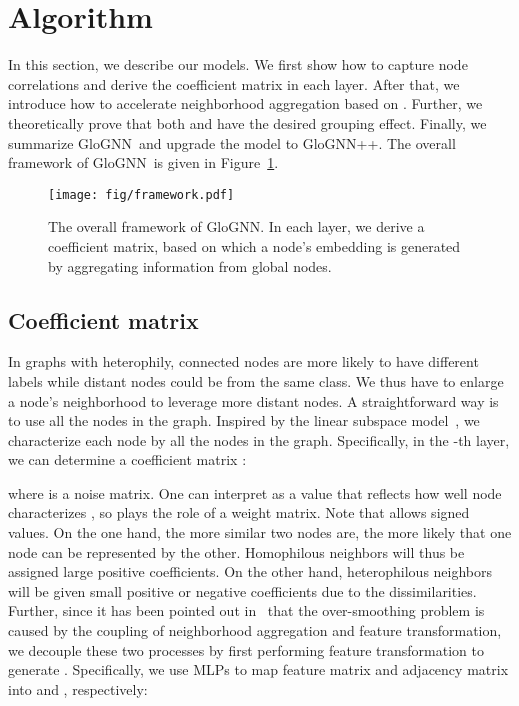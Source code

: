 \documentclass[nohyperref]{article}
\theoremstyle{plain}
\theoremstyle{definition}
\theoremstyle{remark}
\newcommand{\ada}{GloGNN}
\begin{document}
 \section{Algorithm}
\label{sec:algorithm}
In this section,
we describe our models.
We first show how to capture node correlations and derive the coefficient matrix  in each layer.
After that,
we introduce how to accelerate neighborhood aggregation based on .
Further,
we
theoretically prove that both  and  have the desired grouping effect.
Finally,
we summarize \ada\ and upgrade the model to \ada++. 
The overall framework of \ada\ is given in Figure~\ref{fig:framework}.


\begin{figure}[!htbp]
    \centering
        \texttt{[image: fig/framework.pdf]}
        \caption{The overall framework of \ada. In each layer,
        we derive a coefficient matrix, based on which a node's embedding is generated by aggregating information from global nodes.}
        \label{fig:framework}
\end{figure}

\subsection{Coefficient matrix}
In graphs with heterophily,
connected nodes are more likely to have different labels
while distant nodes could be from the same class.
We thus have to enlarge a node's neighborhood to leverage more distant nodes.
A straightforward way is to use all the nodes in the graph.
Inspired by the linear subspace model~\cite{liu2012robust},
we characterize each node by all the nodes in the graph.
Specifically,
in the -th layer,
we can determine a coefficient matrix :

where  is a noise matrix.
One can interpret  as a value that reflects how well node  characterizes ,
so  plays the role of a weight matrix.
Note that  allows signed values.
On the one hand,
the more similar two nodes are,
the more likely that one node can be represented by the other.
Homophilous neighbors will thus be assigned large positive coefficients.
On the other hand,
heterophilous neighbors will be given small positive or negative coefficients due to the dissimilarities.
Further,
since
it has been pointed out in~\cite{liu2020towards} that the over-smoothing problem
is caused by the coupling of neighborhood aggregation and feature transformation,
we decouple these two processes by 
first performing
feature transformation to generate .
Specifically,
we use MLPs to map feature matrix and adjacency matrix 
into  and , respectively:
\end{document}
